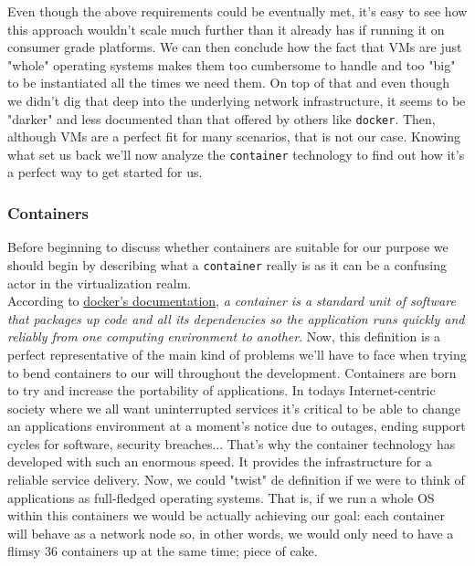                 Even though the above requirements could be eventually met, it's easy to see how this approach wouldn't scale much further than it already has if running it on consumer grade platforms. We can then conclude how the fact that VMs are just "whole" operating systems makes them too cumbersome to handle and too "big" to be instantiated all the times we need them. On top of that and even though we didn't dig that deep into the underlying network infrastructure, it seems to be "darker" and less documented than that offered by others like \texttt{docker}. Then, although VMs are a perfect fit for many scenarios, that is not our case. Knowing what set us back we'll now analyze the \texttt{container} technology to find out how it's a perfect way to get started for us.

            \subsubsection{Containers}
                Before beginning to discuss whether containers are suitable for our purpose we should begin by describing what a \texttt{container} really is as it can be a confusing actor in the virtualization realm.\\

                According to \href{https://www.docker.com/resources/what-container}{docker's documentation}, \textit{a container is a standard unit of software that packages up code and all its dependencies so the application runs quickly and reliably from one computing environment to another}. Now, this definition is a perfect representative of the main kind of problems we'll have to face when trying to bend containers to our will throughout the development. Containers are born to try and increase the portability of applications. In todays Internet-centric society where we all want uninterrupted services it's critical to be able to change an applications environment at a moment's notice due to outages, ending support cycles for software, security breaches... That's why the container technology has developed with such an enormous speed. It provides the infrastructure for a reliable service delivery. Now, we could "twist" de definition if we were to think of applications as full-fledged operating systems. That is, if we run a whole OS within this containers we would be actually achieving our goal: each container will behave as a network node so, in other words, we would only need to have a flimsy $36$ containers up at the same time; piece of cake.\\

